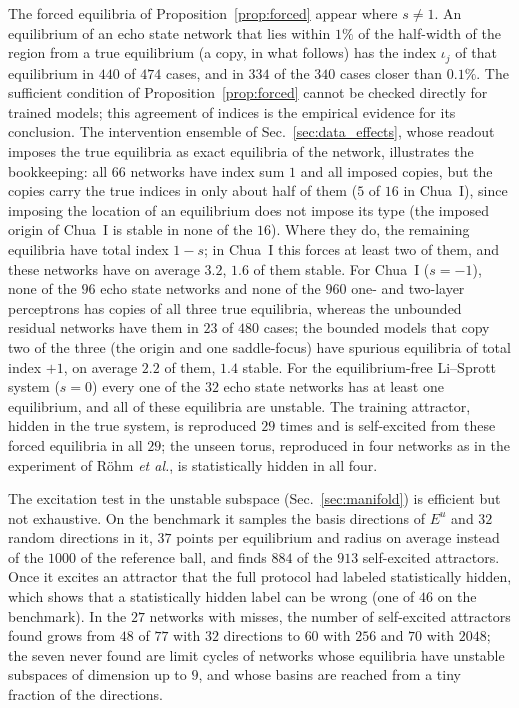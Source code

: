 \documentclass[aip,cha,reprint,amsmath,amssymb,longbibliography]{revtex4-2}
\theoremstyle{definition}
\begin{document}
The forced equilibria of Proposition~\ref{prop:forced} appear where $s\neq1$. An equilibrium of an echo state network that
lies within $1\%$ of the half-width of the region from a true equilibrium (a copy, in what follows) has the index $\iota_j$
of that equilibrium in $440$ of $474$ cases, and in $334$ of the $340$ cases closer than $0.1\%$. The sufficient condition of
Proposition~\ref{prop:forced} cannot be checked directly for trained models; this agreement of indices is the empirical
evidence for its conclusion. The intervention ensemble of Sec.~\ref{sec:data_effects}, whose readout imposes the true
equilibria as exact equilibria of the network, illustrates the bookkeeping: all $66$ networks have index sum $1$ and all
imposed copies, but the copies carry the true indices in only about half of them ($5$ of $16$ in Chua~I), since imposing
the location of an equilibrium does not impose its type (the imposed origin of Chua~I is stable in none of the $16$). Where
they do, the remaining equilibria have total index $1-s$; in Chua~I this forces at least two of them, and these networks
have on average $3.2$, $1.6$ of them stable. For Chua~I ($s=-1$), none of the $96$ echo state
networks and none of the $960$ one- and two-layer perceptrons has copies of all three true equilibria, whereas the
unbounded residual networks have them in $23$ of $480$ cases; the bounded models that copy two of the three (the origin and
one saddle-focus) have spurious equilibria of total index $+1$, on average $2.2$ of them, $1.4$ stable. For the
equilibrium-free Li--Sprott system ($s=0$) every one of the $32$ echo state networks has at least one equilibrium, and all
of these equilibria are unstable. The training attractor, hidden in the true system, is reproduced $29$ times and is
self-excited from these forced equilibria in all $29$; the unseen torus, reproduced in four networks as in the experiment of
R\"ohm \textit{et al.},\cite{Rohm2021} is statistically hidden in all four.

The excitation test in the unstable subspace (Sec.~\ref{sec:manifold}) is efficient but not exhaustive. On the benchmark it
samples the basis directions of $E^u$ and $32$ random directions in it, $37$ points per equilibrium and radius on average
instead of the $1000$ of the reference ball, and finds $884$ of the $913$ self-excited attractors. Once it excites an
attractor that the full protocol had labeled statistically hidden, which shows that a statistically hidden label can be
wrong (one of $46$ on the benchmark). In the $27$ networks with misses, the number of self-excited attractors found grows
from $48$ of $77$ with $32$ directions to $60$ with $256$ and $70$ with $2048$; the seven never found are limit cycles of
networks whose equilibria have unstable subspaces of dimension up to $9$, and whose basins are reached from a tiny
fraction of the directions.
\end{document}

